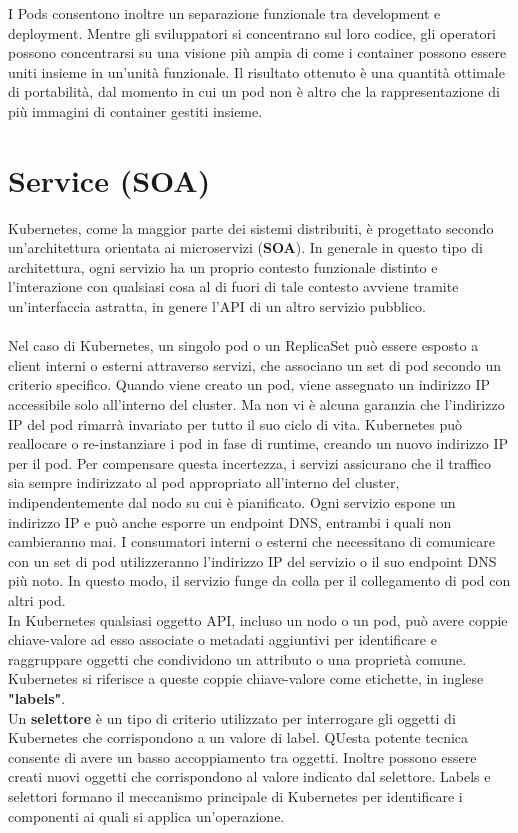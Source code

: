 \documentclass[12pt, a4paper]{report}
\begin{document}
I Pods consentono inoltre un separazione funzionale tra development e deployment. Mentre gli sviluppatori si concentrano sul loro codice, gli operatori possono concentrarsi su una visione più ampia di come i container possono essere uniti insieme in un'unità funzionale. Il risultato ottenuto è una quantità ottimale di portabilità, dal momento in cui un pod non è altro che la rappresentazione di più immagini di container gestiti insieme.
\section{Service (SOA)}
Kubernetes, come la maggior parte dei sistemi distribuiti, è progettato secondo un'architettura orientata ai microservizi (\textbf{SOA}). In generale in questo tipo di architettura, ogni servizio ha un proprio contesto funzionale distinto e l'interazione con qualsiasi cosa al di fuori di tale contesto avviene tramite un'interfaccia astratta, in genere l'API di un altro servizio pubblico.\\
\\
Nel caso di Kubernetes, un singolo pod o un ReplicaSet può essere esposto a client interni o esterni attraverso servizi, che associano un set di pod secondo un criterio specifico. Quando viene creato un pod, viene assegnato un indirizzo IP accessibile solo all'interno del cluster. Ma non vi è alcuna garanzia che l'indirizzo IP del pod rimarrà invariato per tutto il suo ciclo di vita. Kubernetes può reallocare o re-instanziare i pod in fase di runtime, creando un nuovo indirizzo IP per il pod. Per compensare questa incertezza, i servizi assicurano che il traffico sia sempre indirizzato al pod appropriato all'interno del cluster, indipendentemente dal nodo su cui è pianificato.  Ogni servizio espone un indirizzo IP e può anche esporre un endpoint DNS, entrambi i quali non cambieranno mai. I consumatori interni o esterni che necessitano di comunicare con un set di pod utilizzeranno l'indirizzo IP del servizio o il suo endpoint DNS più noto. In questo modo, il servizio funge da colla per il collegamento di pod con altri pod.
\\
In Kubernetes qualsiasi oggetto API, incluso un nodo o un pod, può avere coppie chiave-valore ad esso associate o metadati aggiuntivi per identificare e raggruppare oggetti che condividono un attributo o una proprietà comune. Kubernetes si riferisce a queste coppie chiave-valore come etichette, in inglese \textbf{"labels"}. \\
Un \textbf{selettore} è un tipo di criterio utilizzato per interrogare gli oggetti di Kubernetes che corrispondono a un valore di label. QUesta potente tecnica consente di avere un basso accoppiamento tra oggetti. Inoltre possono essere creati nuovi oggetti che corrispondono al valore indicato dal selettore. Labels e selettori formano il meccanismo principale di Kubernetes per identificare i componenti ai quali si applica un'operazione.\\
\end{document}
